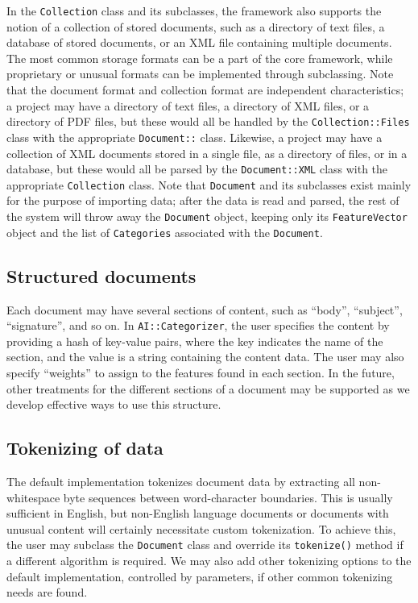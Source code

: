 \documentclass[twocolumn]{article}
\begin{document}
In the \texttt{Collection} class and its subclasses, the framework
also supports the notion of a collection of stored documents, such as
a directory of text files, a database of stored documents, or an XML
file containing multiple documents.  The most common storage formats
can be a part of the core framework, while proprietary or unusual
formats can be implemented through subclassing.  Note that the
document format and collection format are independent characteristics;
a project may have a directory of text files, a directory of XML
files, or a directory of PDF files, but these would all be handled by
the \texttt{Collection::Files} class with the appropriate
\texttt{Document::} class.  Likewise, a project may have a collection
of XML documents stored in a single file, as a directory of files, or
in a database, but these would all be parsed by the
\texttt{Document::XML} class with the appropriate \texttt{Collection}
class. Note that \texttt{Document} and its subclasses exist mainly for
the purpose of importing data; after the data is read and parsed, the
rest of the system will throw away the \texttt{Document} object,
keeping only its \texttt{FeatureVector} object and the list of
\texttt{Categories} associated with the \texttt{Document}.

\subsection*{Structured documents}
Each document may have several sections of content, such as ``body'',
``subject'', ``signature'', and so on.  In \texttt{AI::Categorizer},
the user specifies the content by providing a hash of key-value pairs,
where the key indicates the name of the section, and the value is a
string containing the content data.  The user may also specify
``weights'' to assign to the features found in each section.  In the
future, other treatments for the different sections of a document may
be supported as we develop effective ways to use
this structure.


\subsection*{Tokenizing of data}
The default implementation tokenizes document data by extracting 
all non-whitespace byte sequences between word-character 
boundaries.  This is usually sufficient in English,
but non-English language documents or documents with unusual content
will certainly necessitate custom tokenization.  To achieve this, the
user may subclass the \texttt{Document} class and override its
\texttt{tokenize()} method if a different algorithm is required.  We
may also add other tokenizing options to the default implementation,
controlled by parameters, if other common tokenizing needs are found.
\end{document}
